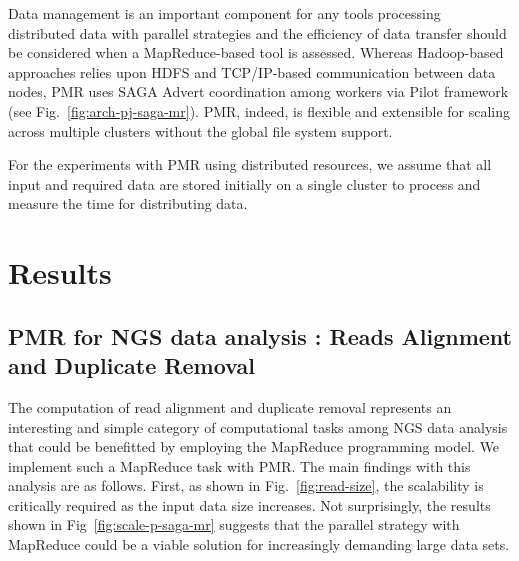 \documentclass{acm_proc_article-sp}
\begin{document}
Data management is an important component for any tools processing distributed data with parallel strategies and the efficiency of data transfer should be considered when a MapReduce-based tool is assessed.  Whereas Hadoop-based approaches relies upon HDFS and TCP/IP-based communication between data nodes, PMR uses SAGA Advert coordination among workers via Pilot framework (see Fig.~\ref{fig:arch-pj-saga-mr}).  PMR, indeed, is flexible and extensible for scaling across multiple clusters without the global file system support.  
 
 
For the experiments with PMR using distributed resources, we assume
that all input and required data are stored initially on a single
cluster to process and measure the time for distributing data.



\section{Results}\label{sec:results}

\subsection{PMR for NGS data analysis : Reads Alignment and Duplicate
  Removal}

The computation of read alignment and duplicate removal represents an
interesting and simple category of computational tasks among NGS data
analysis that could be benefitted by employing the MapReduce
programming model.  We implement such a MapReduce task with PMR.  The
main findings with this analysis are as follows.  First, as shown in
Fig.~\ref{fig:read-size}, the scalability is critically required as
the input data size increases.  Not surprisingly, the results shown in
Fig~\ref{fig:scale-p-saga-mr} suggests that the parallel strategy with
MapReduce could be a viable solution for increasingly demanding large
data sets.
\end{document}

